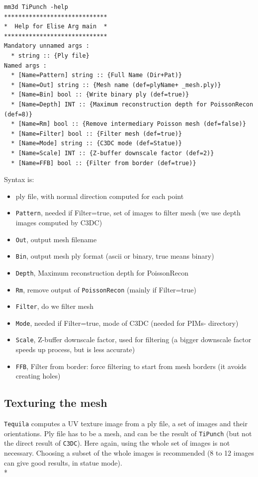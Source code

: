 \begin{verbatim}
mm3d TiPunch -help
*****************************
*  Help for Elise Arg main  *
*****************************
Mandatory unnamed args : 
  * string :: {Ply file}
Named args : 
  * [Name=Pattern] string :: {Full Name (Dir+Pat)}
  * [Name=Out] string :: {Mesh name (def=plyName+ _mesh.ply)}
  * [Name=Bin] bool :: {Write binary ply (def=true)}
  * [Name=Depth] INT :: {Maximum reconstruction depth for PoissonRecon (def=8)}
  * [Name=Rm] bool :: {Remove intermediary Poisson mesh (def=false)}
  * [Name=Filter] bool :: {Filter mesh (def=true)}
  * [Name=Mode] string :: {C3DC mode (def=Statue)}
  * [Name=Scale] INT :: {Z-buffer downscale factor (def=2)}
  * [Name=FFB] bool :: {Filter from border (def=true)}
\end{verbatim}

Syntax is:

\begin{itemize}
  \item ply file, with normal direction computed for each point
  \item {\tt Pattern}, needed if Filter=true, set of images to filter mesh (we use depth images computed by C3DC)
  \item {\tt Out}, output mesh filename
  \item {\tt Bin}, output mesh ply format (ascii or binary, true means binary)
  \item {\tt Depth}, Maximum reconstruction depth for PoissonRecon
  \item {\tt Rm}, remove output of {\tt PoissonRecon} (mainly if Filter=true)
  \item {\tt Filter}, do we filter mesh
  \item {\tt Mode}, needed if Filter=true, mode of C3DC (needed for PIMs- directory)
  \item {\tt Scale}, Z-buffer downscale factor, used for filtering (a bigger downscale factor speeds up process, but is less accurate)
  \item {\tt FFB}, Filter from border: force filtering to start from mesh borders (it avoids creating holes)
\end{itemize}

\subsection{Texturing the mesh}

{\tt Tequila} computes a UV texture image from a ply file, a set of images and their orientations. Ply file has to be a mesh, and can be the result of {\tt TiPunch} (but not the direct result of {\tt C3DC}).
Here again, using the whole set of images is not necessary. Choosing a subset of the whole images is recommended (8 to 12 images can give good results, in statue mode).\\*

